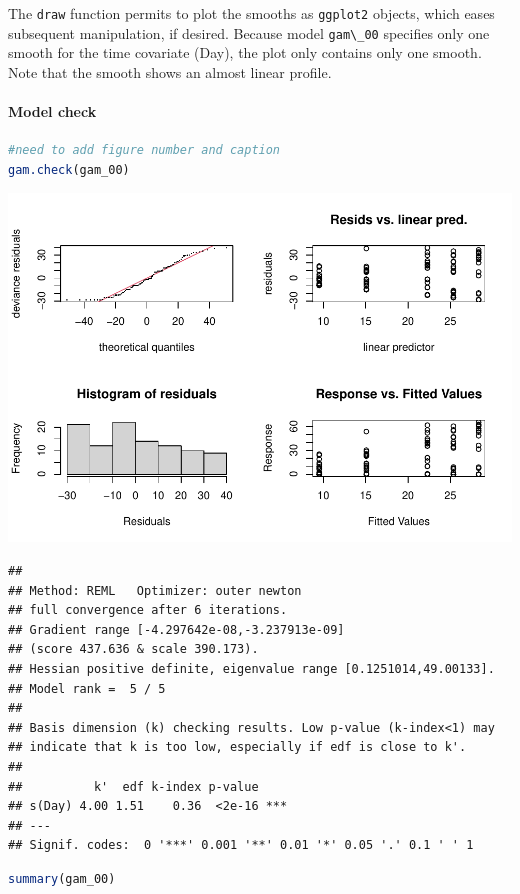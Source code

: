 \documentclass[
]{article}
\newcommand{\passthrough}[1]{#1}
\let\oldparagraph\paragraph
\renewcommand{\paragraph}[1]{\oldparagraph{#1}\mbox{}}
\begin{document}
The \passthrough{\lstinline!draw!} function permits to plot the smooths as \passthrough{\lstinline!ggplot2!} objects, which eases subsequent manipulation, if desired. Because model \passthrough{\lstinline!gam\_00!} specifies only one smooth for the time covariate (Day), the plot only contains only one smooth. Note that the smooth shows an almost linear profile.

\hypertarget{model-check}{%
\paragraph{Model check}\label{model-check}}

\begin{lstlisting}[language=R]
#need to add figure number and caption
gam.check(gam_00)
\end{lstlisting}

\includegraphics{Full_document_files/figure-latex/first-GAM-check-1}

\begin{lstlisting}
## 
## Method: REML   Optimizer: outer newton
## full convergence after 6 iterations.
## Gradient range [-4.297642e-08,-3.237913e-09]
## (score 437.636 & scale 390.173).
## Hessian positive definite, eigenvalue range [0.1251014,49.00133].
## Model rank =  5 / 5 
## 
## Basis dimension (k) checking results. Low p-value (k-index<1) may
## indicate that k is too low, especially if edf is close to k'.
## 
##          k'  edf k-index p-value    
## s(Day) 4.00 1.51    0.36  <2e-16 ***
## ---
## Signif. codes:  0 '***' 0.001 '**' 0.01 '*' 0.05 '.' 0.1 ' ' 1
\end{lstlisting}

\begin{lstlisting}[language=R]
summary(gam_00)
\end{lstlisting}
\end{document}
